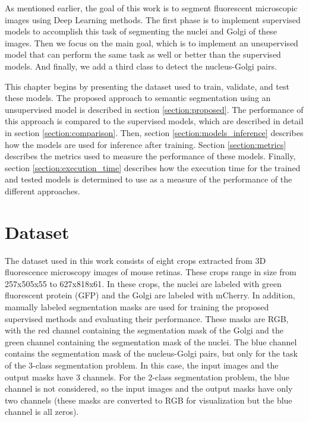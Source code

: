 \cleardoublepage
\label{chapter:methodology}


As mentioned earlier, the goal of this work is to segment fluorescent microscopic images using Deep Learning methods. The first phase is to implement supervised models to accomplish this task of segmenting the nuclei and Golgi of these images. Then we focus on the main goal, which is to implement an unsupervised model that can perform the same task as well or better than the supervised models. And finally, we add a third class to detect the nucleus-Golgi pairs.

This chapter begins by presenting the dataset used to train, validate, and test these models. The proposed approach to semantic segmentation using an unsupervised model is described in section \ref{section:proposed}. The performance of this approach is compared to the supervised models, which are described in detail in section \ref{section:comparison}. Then, section \ref{section:models_inference} describes how the models are used for inference after training. Section \ref{section:metrics} describes the metrics used to measure the performance of these models. Finally, section \ref{section:execution_time} describes how the execution time for the trained and tested models is determined to use as a measure of the performance of the different approaches.

\section{Dataset}
\label{section:dataset}

The dataset used in this work consists of eight crops extracted from \ac{3D} fluorescence microscopy images of mouse retinas. These crops range in size from 257x505x55 to 627x818x61. In these crops, the nuclei are labeled with green fluorescent protein (GFP) and the Golgi are labeled with mCherry. In addition, manually labeled segmentation masks are used for training the proposed supervised methods and evaluating their performance. These masks are RGB, with the red channel containing the segmentation mask of the Golgi and the green channel containing the segmentation mask of the nuclei. The blue channel contains the segmentation mask of the nucleus-Golgi pairs, but only for the task of the 3-class segmentation problem. In this case, the input images and the output masks have 3 channels. For the 2-class segmentation problem, the blue channel is not considered, so the input images and the output masks have only two channels (these masks are converted to RGB for visualization but the blue channel is all zeros).

